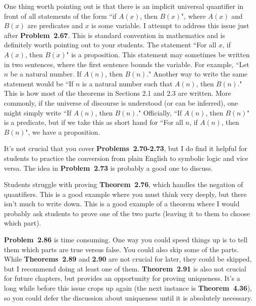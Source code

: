 \documentclass[11pt]{article}%
\newcommand{\blankline}{\pagebreak[2]\vspace{.5\baselineskip}}
\begin{document}
\blankline

One thing worth pointing out is that there is an implicit universal quantifier in front of all statements of the form ``if $A(x)$, then $B(x)$", where $A(x)$ and $B(x)$ are predicates and $x$ is some variable. I attempt to address this issue just after \textbf{Problem~2.67}. This is standard convention in mathematics and is definitely worth pointing out to your students. The statement ``For all $x$, if $A(x)$, then $B(x)$" is a proposition. This statement may sometimes be written in two sentences, where the first sentence bounds the variable. For example, ``Let $n$ be a natural number. If $A(n)$, then $B(n)$." Another way to write the same statement would be ``If $n$ is a natural number such that $A(n)$, then $B(n)$." This is how most of the theorems in Sections 2.1 and 2.3 are written. More commonly, if the universe of discourse is understood (or can be inferred), one might simply write ``If $A(n)$, then $B(n)$."  Officially, ``If $A(n)$, then $B(n)$" is a predicate, but if we take this as short hand for ``For all $n$, if $A(n)$, then $B(n)$", we have a proposition.  

\blankline

It's not crucial that you cover \textbf{Problems~2.70-2.73}, but I do find it helpful for students to practice the conversion from plain English to symbolic logic and vice versa.  The idea in \textbf{Problem~2.73} is probably a good one to discuss.

\blankline

Students struggle with proving \textbf{Theorem~2.76}, which handles the negation of quantifiers.  This is a good example where you must think very deeply, but there isn't much to write down.  This is a good example of a theorem where I would probably ask students to prove one of the two parts (leaving it to them to choose which part).

\blankline

\textbf{Problem~2.86} is time consuming.  One way you could speed things up is to tell them which parts are true versus false.  You could also skip some of the parts.  While \textbf{Theorems~2.89} and \textbf{2.90} are not crucial for later, they could be skipped, but I recommend doing at least one of them.  \textbf{Theorem~2.91} is also not crucial for future chapters, but provides an opportunity for proving uniqueness.  It's a long while before this issue crops up again (the next instance is \textbf{Theorem~4.36}), so you could defer the discussion about uniqueness until it is absolutely necessary. 
\end{document}
